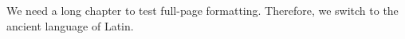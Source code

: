     We need a long chapter to test full-page formatting. Therefore,
    we switch to the ancient language of Latin.

    
